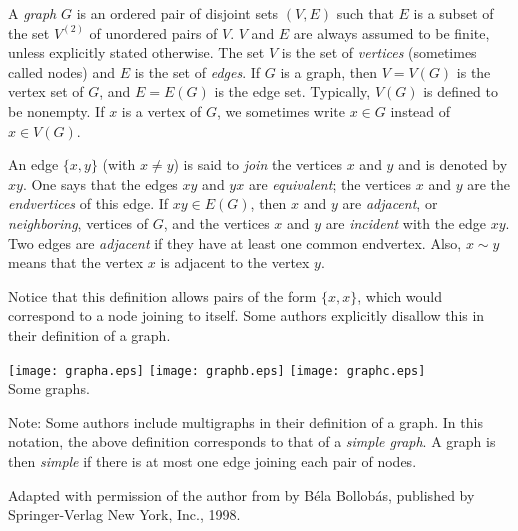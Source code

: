 \documentclass{article}
\begin{document}
A \emph{graph} $G$ is an ordered pair of disjoint sets $(V, E)$ such that $E$ is a subset of the set $V^{(2)}$ of unordered pairs of $V$. $V$ and $E$ are always assumed to be finite, unless explicitly stated otherwise. The set $V$ is the set of \emph{vertices} (sometimes called nodes) and $E$ is the set of \emph{edges}. If $G$ is a graph, then $V = V(G)$ is the vertex set of $G$, and $E = E(G)$ is the edge set.
Typically, $V(G)$ is defined to be nonempty. If $x$ is a vertex of $G$, we sometimes write $x \in G$ instead of $x \in V(G)$.

An edge $\{x, y\}$ (with $x\neq y$) is said to \emph{join} the vertices $x$ and $y$ and is denoted by $xy$. One says that the edges $xy$ and $yx$ are \emph{equivalent}; the vertices $x$ and $y$ are the \emph{endvertices} of this edge. If $xy \in E(G)$, then $x$ and $y$ are \emph{adjacent}, or \emph{neighboring}, vertices of $G$, and the vertices $x$ and $y$ are \emph{incident} with the edge $xy$. Two edges are \emph{adjacent} if they have at least one common endvertex. Also, $x \sim y$ means that the vertex $x$ is adjacent to the vertex $y$.

Notice that this definition allows pairs of the form $\{x,x\}$, which would correspond to a node joining to itself.  Some authors explicitly disallow this in their definition of a graph.

\begin{center}
\texttt{[image: grapha.eps]} \qquad \qquad
\texttt{[image: graphb.eps]} \qquad \qquad
\texttt{[image: graphc.eps]} \\
Some graphs.
\end{center}

Note:  Some authors include multigraphs in their definition of a graph.  In this notation, the above definition corresponds to that of a \emph{simple graph}.  A graph is then \emph{simple} if there is at most one edge joining each pair of nodes.

\footnotesize{Adapted with permission of the author from \emph{} by B\'{e}la Bollob\'{a}s, published by Springer-Verlag New York, Inc., 1998.}
\end{document}
